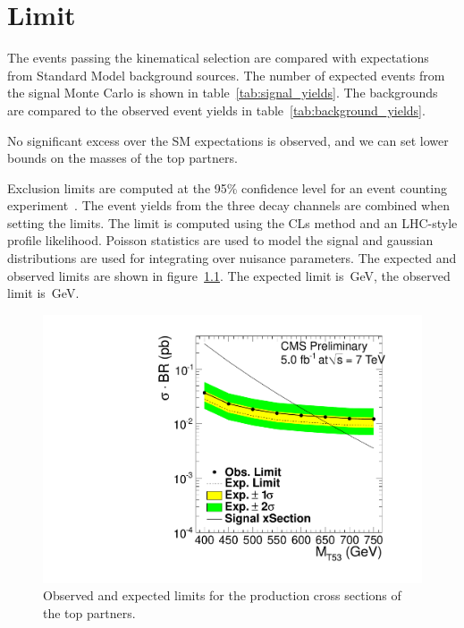 \chapter{Limit}
The events passing the kinematical selection are compared with expectations
from Standard Model background sources. The number of expected events from
the signal Monte Carlo is shown in table~\ref{tab:signal_yields}. The
backgrounds are compared to the observed event yields in
table~\ref{tab:background_yields}.


No significant excess over the SM expectations is observed, and we can set
lower bounds on the masses of the top partners.

Exclusion limits are computed at the 95\% confidence level for an event
counting experiment~\cite{2010acat.confE..57M}. The event yields from the three decay channels are
combined when setting the limits. The limit is computed using the CLs method
and an LHC-style profile likelihood. Poisson statistics are used to model
the signal and gaussian distributions are used for integrating over nuisance
parameters. The expected and observed limits are shown in
figure~\ref{fig:limit}.
The expected limit is~\unit[658]{GeV}, the observed limit
is~\unit[633]{GeV}.

\begin{figure}[htb]
    \centering
    \includegraphics[width=.9\textwidth]{images/pdf/oLimit_limit_macro_4jets_opt_btag_200_350_02}

    \caption{Observed and expected limits for the production cross sections
    of the top partners.}
    \label{fig:limit}
\end{figure}
